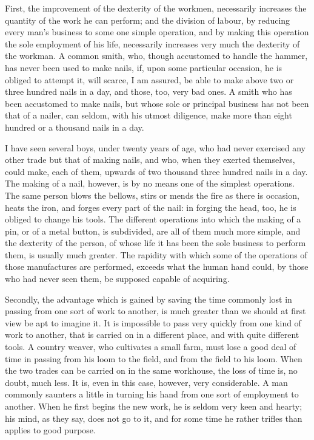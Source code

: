 First, the improvement of the dexterity of the workmen, necessarily increases the quantity of the work he can perform; and the division of labour, by reducing every man’s business to some one simple operation, and by making this operation the sole employment of his life, necessarily increases very much the dexterity of the workman. A common smith, who, though accustomed to handle the hammer, has never been used to make nails, if, upon some particular occasion, he is obliged to attempt it, will scarce, I am assured, be able to make above two or three hundred nails in a day, and those, too, very bad ones. A smith who has been accustomed to make nails, but whose sole or principal business has not been that of a nailer, can seldom, with his utmost diligence, make more than eight hundred or a thousand nails in a day.\par

I have seen several boys, under twenty years of age, who had never exercised any other trade but that of making nails, and who, when they exerted themselves, could make, each of them, upwards of two thousand three hundred nails in a day. The making of a nail, however, is by no means one of the simplest operations. The same person blows the bellows, stirs or mends the fire as there is occasion, heats the iron, and forges every part of the nail: in forging the head, too, he is obliged to change his tools. The different operations into which the making of a pin, or of a metal button, is subdivided, are all of them much more simple, and the dexterity of the person, of whose life it has been the sole business to perform them, is usually much greater. The rapidity with which some of the operations of those manufactures are performed, exceeds what the human hand could, by those who had never seen them, be supposed capable of acquiring.\par

Secondly, the advantage which is gained by saving the time commonly lost in passing from one sort of work to another, is much greater than we should at first view be apt to imagine it. It is impossible to pass very quickly from one kind of work to another, that is carried on in a different place, and with quite different tools. A country weaver, who cultivates a small farm, must lose a good deal of time in passing from his loom to the field, and from the field to his loom. When the two trades can be carried on in the same workhouse, the loss of time is, no doubt, much less. It is, even in this case, however, very considerable. A man commonly saunters a little in turning his hand from one sort of employment to another. When he first begins the new work, he is seldom very keen and hearty; his mind, as they say, does not go to it, and for some time he rather trifles than applies to good purpose.\par

